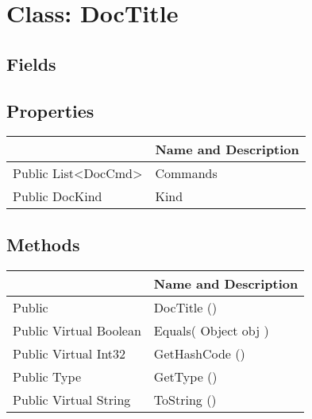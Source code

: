 \documentclass[11pt, oneside, a4paper]{book}
\begin{document}
\hypertarget{SoftwareEngineeringTools.{}Documentation.{}DocTitle}{}
\section{Class: DocTitle}

\subsection{Fields}

\subsection{Properties}
\begin{center}
\begin{tabular}{| p{3cm} | p{12cm} | }
\hline
\textbf{ } & \textbf{ Name and Description}\\
\hline
 Public  List<DocCmd> &  Commands\hypertarget{SoftwareEngineeringTools.{}Documentation.{}DocTitle.{}Commands}{}\\
\hline
 Public  DocKind &  Kind\hypertarget{SoftwareEngineeringTools.{}Documentation.{}DocTitle.{}Kind}{}\\
\hline
\end{tabular}
\end{center}

\subsection{Methods}
\begin{center}
\begin{tabular}{| p{3cm} | p{12cm} | }
\hline
\textbf{ } & \textbf{ Name and Description}\\
\hline
 Public  &  DocTitle ()\hypertarget{SoftwareEngineeringTools.{}Documentation.{}DocTitle.{}DocTitle}{}\\
\hline
 Public  Virtual  Boolean &  Equals(\hypertarget{SoftwareEngineeringTools.{}Documentation.{}DocTitle.{}Equals\_Object}{} Object  obj  )\\
\hline
 Public  Virtual  Int32 &  GetHashCode ()\hypertarget{SoftwareEngineeringTools.{}Documentation.{}DocTitle.{}GetHashCode}{}\\
\hline
 Public  Type &  GetType ()\hypertarget{SoftwareEngineeringTools.{}Documentation.{}DocTitle.{}GetType}{}\\
\hline
 Public  Virtual  String &  ToString ()\hypertarget{SoftwareEngineeringTools.{}Documentation.{}DocTitle.{}ToString}{}\\
\hline
\end{tabular}
\end{center}
 
\end{document}
